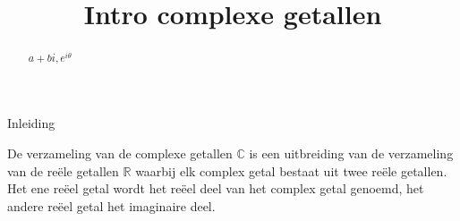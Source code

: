 \documentclass{ximera}
\title[Examples:]{Intro complexe getallen}
\begin{document}
\begin{abstract}
	$a+bi, e^{i\theta}$
\end{abstract}
\maketitle
Inleiding

De verzameling van de complexe getallen $\mathbb{C}$ is een uitbreiding van de verzameling van de reële getallen $\mathbb{R}$ waarbij elk complex getal bestaat uit twee reële getallen. Het ene reëel getal wordt het reëel deel van het complex getal genoemd, het andere reëel getal het imaginaire deel. 
\end{document}
